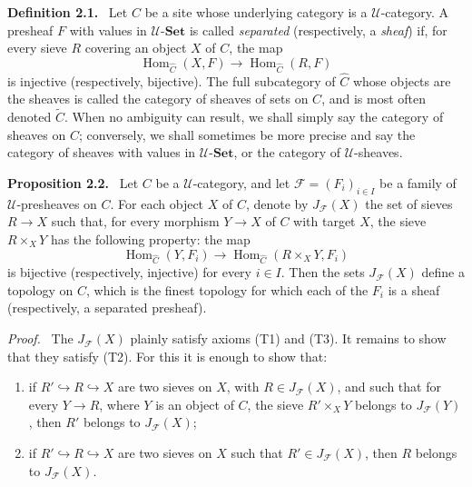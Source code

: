 \documentclass[11pt]{article}
\newcommand{\U}{\mathcal{U}}
\newcommand{\Set}{\mathbf{Set}}
\newcommand{\Hom}{\operatorname{Hom}}
\newcommand{\whC}{\widehat{C}}
\newcommand{\Fcal}{\mathcal{F}}
\newenvironment{statement}[1]{\par\medskip\noindent\textbf{#1.}\ }{\par\medskip}
\newenvironment{prooftext}{\par\noindent\emph{Proof.}\ }{\par\medskip}
\begin{document}
\begin{statement}{Definition 2.1}
Let \(C\) be a site whose underlying category is a \(\U\)-category. A presheaf \(F\) with values in \(\U\)-\(\Set\) is called \emph{separated} (respectively, a \emph{sheaf}) if, for every sieve \(R\) covering an object \(X\) of \(C\), the map
\[
\Hom_{\whC}(X,F)\longrightarrow \Hom_{\whC}(R,F)
\]
is injective (respectively, bijective). The full subcategory of \(\whC\) whose objects are the sheaves is called the category of sheaves of sets on \(C\), and is most often denoted \(\widetilde C\). When no ambiguity can result, we shall simply say the category of sheaves on \(C\); conversely, we shall sometimes be more precise and say the category of sheaves with values in \(\U\)-\(\Set\), or the category of \(\U\)-sheaves.
\end{statement}

\begin{statement}{Proposition 2.2}
Let \(C\) be a \(\U\)-category, and let \(\Fcal=(F_i)_{i\in I}\) be a family of \(\U\)-presheaves on \(C\). For each object \(X\) of \(C\), denote by \(J_{\Fcal}(X)\) the set of sieves \(R\to X\) such that, for every morphism \(Y\to X\) of \(C\) with target \(X\), the sieve \(R\times_XY\) has the following property: the map
\[
\Hom_{\whC}(Y,F_i)\longrightarrow \Hom_{\whC}(R\times_XY,F_i)
\]
is bijective (respectively, injective) for every \(i\in I\). Then the sets \(J_{\Fcal}(X)\) define a topology on \(C\), which is the finest topology for which each of the \(F_i\) is a sheaf (respectively, a separated presheaf).
\end{statement}

\begin{prooftext}
The \(J_{\Fcal}(X)\) plainly satisfy axioms (T1) and (T3). It remains to show that they satisfy (T2). For this it is enough to show that:
\begin{enumerate}[label=\arabic*)]
\item if \(R'\hookrightarrow R\hookrightarrow X\) are two sieves on \(X\), with \(R\in J_{\Fcal}(X)\), and such that for every \(Y\to R\), where \(Y\) is an object of \(C\), the sieve \(R'\times_XY\) belongs to \(J_{\Fcal}(Y)\), then \(R'\) belongs to \(J_{\Fcal}(X)\);

\item if \(R'\hookrightarrow R\hookrightarrow X\) are two sieves on \(X\) such that \(R'\in J_{\Fcal}(X)\), then \(R\) belongs to \(J_{\Fcal}(X)\).
\end{enumerate}
\end{prooftext}
\end{document}

